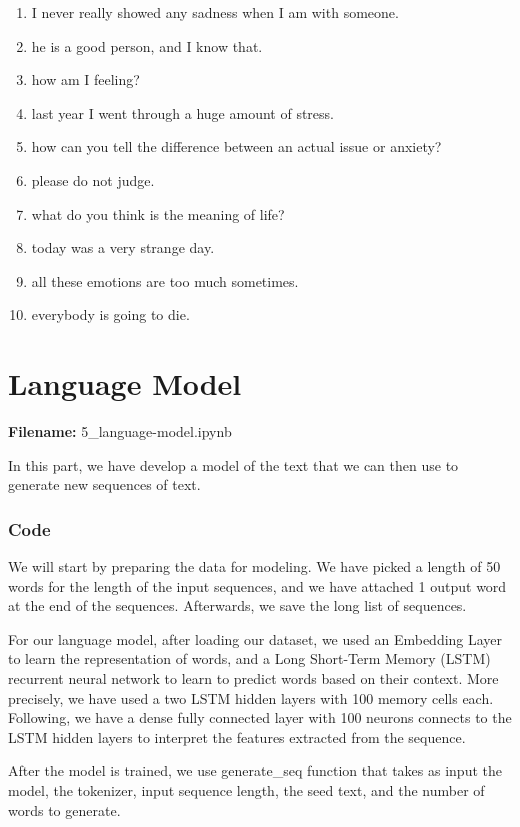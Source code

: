 \documentclass[12pt, a4paper]{article}
\begin{document}
\begin{enumerate}
	\item I never really showed any sadness when I am with someone.
	\item he is a good person, and I know that.
	\item how am I feeling?
	\item last year I went through a huge amount of stress.
	\item how can you tell the difference between an actual issue or anxiety?
	\item please do not judge.
	\item what do you think is the meaning of life?
	\item today was a very strange day.
	\item all these emotions are too much sometimes. 
	\item everybody is going to die.
\end{enumerate}

\newpage
\part{Language Model}
\large{\textbf{Filename:} 5\_language-model.ipynb}

In this part, we have develop a model of the text that we can then use to generate new sequences of text.

\section*{Code}
We will start by preparing the data for modeling. 
We have picked a length of 50 words for the length of the input sequences, and we have attached 1 output word at the end of the sequences. Afterwards, we save the long list of sequences.


For our language model, after loading our dataset, we used an Embedding Layer to learn the representation of words, and a Long Short-Term Memory (LSTM) recurrent neural network to learn to predict words based on their context. More precisely, we have used a two LSTM hidden layers with 100 memory cells each. Following, we have a dense fully connected layer with 100 neurons connects to the LSTM hidden layers to interpret the features extracted from the sequence.

After the model is trained, we use generate\_seq function that takes as input the model, the tokenizer, input sequence length, the seed text, and the number of words to generate. 
\end{document}
